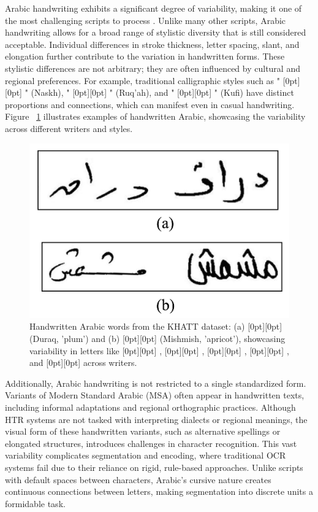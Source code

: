 \documentclass[conference]{IEEEtran}
\newcommand{\artext}[1]{%
  {\fontsize{8pt}{11pt}\selectfont \raisebox{0pt}[0pt][0pt]{\RL{#1}}}%
}
\begin{document}
Arabic handwriting exhibits a significant degree of variability, making it one of the most challenging scripts to process \cite{kasem2023advancements}. Unlike many other scripts, Arabic handwriting allows for a broad range of stylistic diversity that is still considered acceptable. Individual differences in stroke thickness, letter spacing, slant, and elongation further contribute to the variation in handwritten forms. These stylistic differences are not arbitrary; they are often influenced by cultural and regional preferences. For example, traditional calligraphic styles such as "\artext{النسخ}" (Naskh), "\artext{الرقعة}" (Ruq’ah), and "\artext{الكوفي}" (Kufi) have distinct proportions and connections, which can manifest even in casual handwriting. Figure ~\ref{fig:mr}  illustrates examples of handwritten Arabic, showcasing the variability across different writers and styles.


\begin{figure}[ht]
  \centering
  \includegraphics[width=0.7\linewidth]{Figs/fig4.png}
  \caption{Handwritten Arabic words from the KHATT dataset: (a) \artext{دراق} (Duraq, 'plum') and (b) \artext{مشمش} (Mishmish, 'apricot'), showcasing variability in letters like \artext{ش}, \artext{م}, \artext{د}, \artext{ر}, and \artext{ق} across writers.}
  \label{fig:mr}
\end{figure}

Additionally, Arabic handwriting is not restricted to a single standardized form. Variants of Modern Standard Arabic (MSA) often appear in handwritten texts, including informal adaptations and regional orthographic practices. Although HTR systems are not tasked with interpreting dialects or regional meanings, the visual form of these handwritten variants, such as alternative spellings or elongated structures, introduces challenges in character recognition. This vast variability complicates segmentation and encoding, where traditional OCR systems fail due to their reliance on rigid, rule-based approaches. Unlike scripts with default spaces between characters, Arabic’s cursive nature creates continuous connections between letters, making segmentation into discrete units a formidable task. \\
\end{document}
